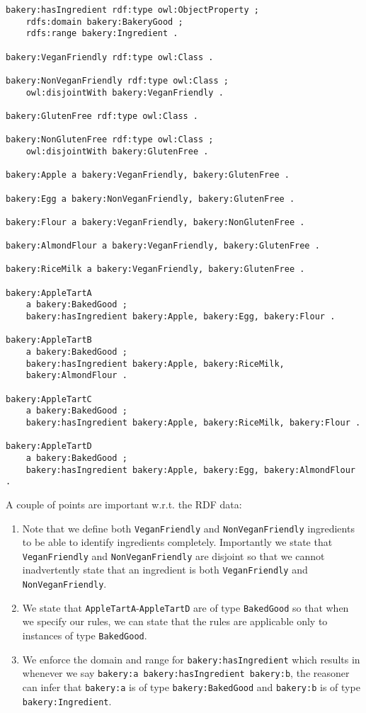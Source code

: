 \documentclass{amsart}
\begin{document}
  \begin{small}
  \begin{Verbatim}
bakery:hasIngredient rdf:type owl:ObjectProperty ;
    rdfs:domain bakery:BakeryGood ;
    rdfs:range bakery:Ingredient .
	
bakery:VeganFriendly rdf:type owl:Class .
	
bakery:NonVeganFriendly rdf:type owl:Class ;
    owl:disjointWith bakery:VeganFriendly .
	
bakery:GlutenFree rdf:type owl:Class .
		
bakery:NonGlutenFree rdf:type owl:Class ;
    owl:disjointWith bakery:GlutenFree .	

bakery:Apple a bakery:VeganFriendly, bakery:GlutenFree .

bakery:Egg a bakery:NonVeganFriendly, bakery:GlutenFree .

bakery:Flour a bakery:VeganFriendly, bakery:NonGlutenFree .

bakery:AlmondFlour a bakery:VeganFriendly, bakery:GlutenFree .

bakery:RiceMilk a bakery:VeganFriendly, bakery:GlutenFree .

bakery:AppleTartA
    a bakery:BakedGood ;
    bakery:hasIngredient bakery:Apple, bakery:Egg, bakery:Flour .
	
bakery:AppleTartB
    a bakery:BakedGood ;
    bakery:hasIngredient bakery:Apple, bakery:RiceMilk, 
	bakery:AlmondFlour .

bakery:AppleTartC
    a bakery:BakedGood ;
    bakery:hasIngredient bakery:Apple, bakery:RiceMilk, bakery:Flour .
	
bakery:AppleTartD
    a bakery:BakedGood ;
    bakery:hasIngredient bakery:Apple, bakery:Egg, bakery:AlmondFlour .		  
  \end{Verbatim}
  \end{small}
  
A couple of points are important w.r.t. the RDF data:
\begin{enumerate}
 \item Note that we define both \texttt{VeganFriendly} and \texttt{NonVeganFriendly} ingredients to be able to identify ingredients completely. Importantly we state that \texttt{VeganFriendly} and \texttt{NonVeganFriendly} are disjoint so that we cannot inadvertently state that an ingredient is both \texttt{VeganFriendly} and \texttt{NonVeganFriendly}.
 \item We state that \texttt{AppleTartA}-\texttt{AppleTartD} are of type \texttt{BakedGood} so that when we specify our rules, we can state that the rules are applicable only to instances of type \texttt{BakedGood}.
 \item We enforce the domain and range for \texttt{bakery:hasIngredient} which results in whenever we say \texttt{bakery:a bakery:hasIngredient bakery:b}, the reasoner can infer that \texttt{bakery:a} is of type \texttt{bakery:BakedGood} and \texttt{bakery:b} is of type \texttt{bakery:Ingredient}.
\end{enumerate}  
\end{document}
